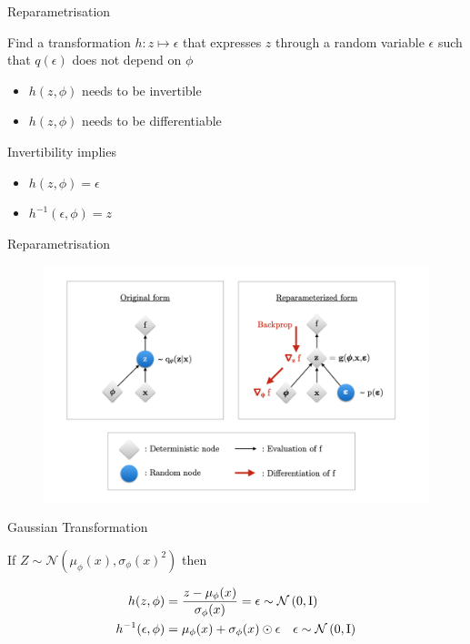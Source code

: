 \begin{frame}{Reparametrisation}

Find a transformation $ h: z \mapsto \epsilon $ that expresses $z$ through a random variable $\epsilon$ such that \alert{ $q(\epsilon)$ does not depend on $\phi $} \pause
\begin{itemize}
\item $ h(z,\phi) $ needs to be invertible \pause
\item $ h(z,\phi) $ needs to be differentiable
\pause
\end{itemize}
Invertibility implies
\begin{itemize}
\item $ h(z,\phi) = \epsilon $
\item $ h^{-1}(\epsilon,\phi) = z $ 
\end{itemize}


\end{frame}

\begin{frame}{Reparametrisation}
\begin{figure}
\includegraphics[scale=0.45]{rep_cg}
\end{figure}
\end{frame}

\begin{frame}{Gaussian Transformation}

If $Z \sim \mathcal N(\mu_\phi(x), \sigma_\phi(x)^2)$ then

\begin{align*}
h(z,\phi) &= \frac{z - \mu_\phi(x)}{ \sigma_\phi(x) } = \epsilon \sim \mathcal{N}\left(0,\operatorname{I}\right) \\
h^{-1}(\epsilon,\phi) &= \mu_\phi(x) + \sigma_\phi(x) \odot \epsilon~~~\epsilon \sim \mathcal{N}\left(0,\operatorname{I}\right)
\end{align*}


\end{frame}

